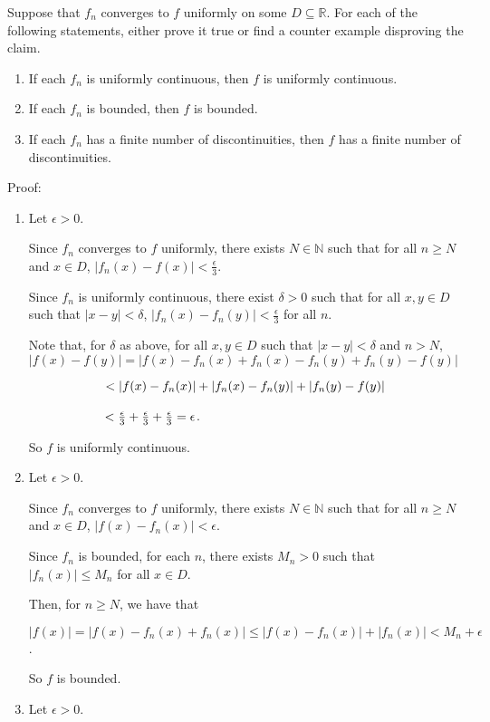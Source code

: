 \documentclass{article}
\begin{document}
Suppose that $f_n$ converges to $f$ uniformly on some $D\subseteq \mathbb{R}$.  For each of the following statements, either prove it true or find a counter example disproving the claim.
\begin{enumerate}
\item If each $f_n$ is uniformly continuous, then $f$ is uniformly continuous.
\item If each $f_n$ is bounded, then $f$ is bounded.
\item If each $f_n$ has a finite number of discontinuities, then $f$ has a finite number of discontinuities.
\end{enumerate}

Proof:

\begin{enumerate}
    \item Let $\epsilon > 0$.
    
    Since $f_n$ converges to $f$ uniformly, there exists $N \in \mathbb{N}$ such that for all $n \geq N$ and $x \in D$, $|f_n(x)-f(x)| < \frac{\epsilon}{3}$.

    Since $f_n$ is uniformly continuous, there exist $\delta > 0$ such that for all $x,y \in D$ such that $|x-y| < \delta$, $|f_n(x)-f_n(y)| < \frac{\epsilon}{3}$ for all $n$.

    Note that, for $\delta$ as above, for all $x, y \in D$ such that $|x-y| < \delta$ and $n > N$, \\$|f(x) - f(y)| = |f(x) - f_n(x) + f_n(x) - f_n(y)+f_n(y) - f(y)| $
    
    $\hspace{2.1cm}< |f(x)-f_n(x)| + |f_n(x)-f_n(y)| + |f_n(y) - f(y)|$
    
    $\hspace{2.1cm} < \frac{\epsilon}{3} + \frac{\epsilon}{3} + \frac{\epsilon}{3} = \epsilon$.

    So $f$ is uniformly continuous.
    
    \item Let $\epsilon > 0$.

    Since $f_n$ converges to $f$ uniformly, there exists $N \in \mathbb{N}$ such that for all $n \geq N$ and $x \in D$, $|f(x)-f_n(x)| < \epsilon$.

    Since $f_n$ is bounded, for each $n$, there exists $M_n > 0$ such that \\$|f_n(x)| \le M_n$ for all $x \in D$.

    Then, for $n \geq N$, we have that 
    
    $|f(x)| = |f(x) - f_n(x) + f_n(x)| \le |f(x) - f_n(x)| + |f_n(x)| < M_n + \epsilon$.

    So $f$ is bounded.

    \item Let $\epsilon > 0$.

    
    
\end{enumerate}
\end{document}
